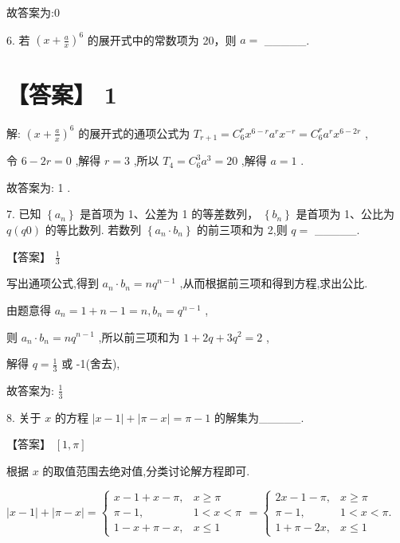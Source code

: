 \documentclass[10pt]{article}
\begin{document}
故答案为:0

6. 若 \({\left( x + \frac{a}{x}\right) }^{6}\) 的展开式中的常数项为 20，则 \(a =\) \_\_\_\_\_.

\section*{【答案】 1}

解: \({\left( x + \frac{a}{x}\right) }^{6}\) 的展开式的通项公式为 \({T}_{r + 1} = {C}_{6}^{r}{x}^{6 - r}{a}^{r}{x}^{-r} = {C}_{6}^{r}{a}^{r}{x}^{6 - {2r}}\) ,

令 \(6 - {2r} = 0\) ,解得 \(r = 3\) ,所以 \({T}_{4} = {C}_{6}^{3}{a}^{3} = {20}\) ,解得 \(a = 1\) .

故答案为: 1 .

7. 已知 \(\left\{  {a}_{n}\right\}\) 是首项为 1、公差为 1 的等差数列， \(\left\{  {b}_{n}\right\}\) 是首项为 1、公比为 \(q\left( {q0}\right)\) 的等比数列. 若数列 \(\left\{  {{a}_{n} \cdot  {b}_{n}}\right\}\) 的前三项和为 2,则 \(q =\) \_\_\_\_\_.

【答案】 \(\frac{1}{3}\)

写出通项公式,得到 \({a}_{n} \cdot  {b}_{n} = n{q}^{n - 1}\) ,从而根据前三项和得到方程,求出公比.

由题意得 \({a}_{n} = 1 + n - 1 = n,{b}_{n} = {q}^{n - 1}\) ,

则 \({a}_{n} \cdot  {b}_{n} = n{q}^{n - 1}\) ,所以前三项和为 \(1 + {2q} + 3{q}^{2} = 2\) ,

解得 \(q = \frac{1}{3}\) 或 -1(舍去),

故答案为: \(\frac{1}{3}\)

8. 关于 \(x\) 的方程 \(\left| {x - 1}\right|  + \left| {\pi  - x}\right|  = \pi  - 1\) 的解集为\_\_\_\_\_.

【答案】 \(\left\lbrack  {1,\pi }\right\rbrack\)

根据 \(x\) 的取值范围去绝对值,分类讨论解方程即可.

\(\left| {x - 1}\right|  + \left| {\pi  - x}\right|  = \left\{  {\begin{array}{ll} x - 1 + x - \pi , & x \geq  \pi \\  \pi  - 1, & 1 < x < \pi \\  1 - x + \pi  - x, & x \leq  1 \end{array} = \left\{  \begin{array}{ll} {2x} - 1 - \pi , & x \geq  \pi \\  \pi  - 1, & 1 < x < \pi . \\  1 + \pi  - {2x}, & x \leq  1 \end{array}\right. }\right.\)
\end{document}
